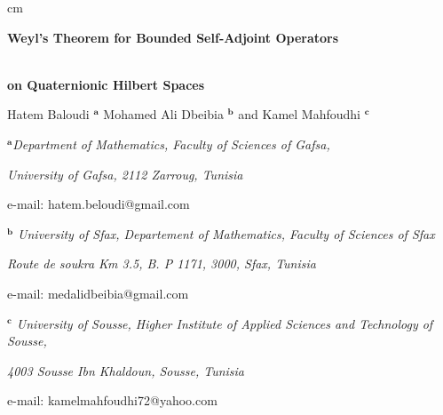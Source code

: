 \documentclass[12pt,a4paper]{article}
\theoremstyle{plain}
\theoremstyle{definition}
\theoremstyle{remark}
\newcommand{\sigS}{\sigma_S}
\newcommand{\sigeS}{\sigma_{e}^{S}}
\newcommand{\sigdS}{\sigma_{d}^{S}}
\begin{document}
\par {}
cm \centerline{\bf  \large  Weyl's Theorem for Bounded Self-Adjoint Operators\\
  \\
}%
 \par \vskip 0.3cm \centerline{\bf \large on Quaternionic Hilbert Spaces \large }

  \par
\vskip 0.7cm

 {\centerline{\large  Hatem Baloudi $^{\textbf{a}}$ Mohamed Ali Dbeibia $^{\textbf{b}}$ and Kamel Mahfoudhi $^{\textbf{c}}$}
 \par
\vskip 0.3cm
\centerline{\it \small $^{\textbf{a}}$Department of Mathematics, Faculty of Sciences of Gafsa,}%
\centerline{\it\small  University
of Gafsa, 2112 Zarroug, Tunisia}%
\centerline{e-mail: hatem.beloudi@gmail.com}
\centerline{\it \small $^{\textbf{b}}$ University of Sfax, Departement of Mathematics, Faculty of Sciences of Sfax}%
\centerline{\it\small Route de soukra Km 3.5, B. P 1171, 3000, Sfax, Tunisia}%
\centerline{e-mail: medalidbeibia@gmail.com}%
\centerline{\it \small $^{\textbf{c}}$ University of Sousse, Higher Institute of Applied Sciences and Technology of Sousse,}
\centerline{\it\small 4003 Sousse Ibn Khaldoun, Sousse, Tunisia}%
\centerline{e-mail: kamelmahfoudhi72@yahoo.com }

\begin{abstract}
Let $T$ be a bounded self-adjoint operator on a separable
infinite-dimensional right quaternionic Hilbert space, and let
$\sigdS(T)$ be the set of right eigenvalues of finite type. We prove that Weyl's theorem holds for $T$:
$$\sigeS(T)=\sigS(T)\setminus\sigdS(T),$$ which completes the inclusion
obtained in the general case. The proof proceeds through a single
three-way criterion: a point of $\sigS(T)$ lies outside $\sigeS(T)$,
and equally lies in $\sigdS(T)$, exactly when it is isolated with a
spectral atom of finite rank. The natural route through Riesz
projections is not available as it stands, because a Riesz projection
need not be orthogonal; we show that for a self-adjoint operator it in
fact is, the Riesz projection of an isolated spectral part coinciding
with the corresponding spectral projection, so that the algebraic and
geometric multiplicities agree. A $2\times2$ quaternionic matrix shows
that this last identity fails without self-adjointness, and a normal
operator with genuinely spherical $S$-spectrum shows what has to
change in the normal case.
\end{abstract}

}
\end{document}

